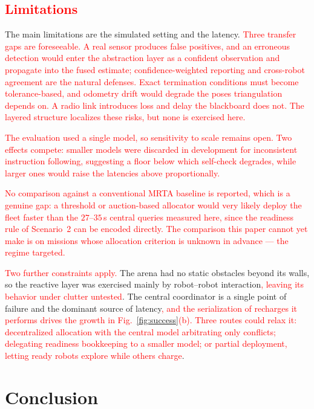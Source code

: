 \documentclass[conference]{IEEEtran}
\newif\ifrevmarks\revmarkstrue
\newcommand{\rev}[1]{\ifrevmarks\textcolor{red}{#1}\else#1\fi}
\begin{document}
\rev{\subsection{Limitations}}

The main limitations are the simulated setting and the latency.
\rev{Three transfer gaps are foreseeable. A real sensor produces false
positives, and an erroneous detection would enter the abstraction layer
as a confident observation and propagate into the fused estimate;
confidence-weighted reporting and cross-robot agreement are the natural
defenses. Exact termination conditions must become tolerance-based, and
odometry drift would degrade the poses triangulation depends on. A radio
link introduces loss and delay the blackboard does not. The layered
structure localizes these risks, but none is exercised here.}

\rev{The evaluation used a single model, so sensitivity to scale remains
open. Two effects compete: smaller models were discarded in development
for inconsistent instruction following, suggesting a floor below which
self-check degrades, while larger ones would raise the latencies above
proportionally.}

\rev{No comparison against a conventional MRTA baseline is reported,
which is a genuine gap: a threshold or auction-based allocator would
very likely deploy the fleet faster than the $27$--$35$\,s central
queries measured here, since the readiness rule of Scenario~2 can be
encoded directly. The comparison this paper cannot yet make is on
missions whose allocation criterion is unknown in advance --- the regime
targeted.}

\rev{Two further constraints apply.} The arena had no static obstacles
beyond its walls, so the reactive layer was exercised mainly by
robot--robot interaction\rev{, leaving its behavior under clutter
untested}. The central coordinator is a single point of failure and the
dominant source of latency\rev{, and the serialization of recharges it
performs drives the growth in Fig.~\ref{fig:success}(b). Three routes
could relax it: decentralized allocation with the central model
arbitrating only conflicts; delegating readiness bookkeeping to a smaller
model; or partial deployment, letting ready robots explore while others
charge}.

\section{Conclusion}
\end{document}
